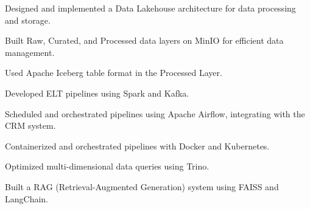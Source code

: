 \vspace{0.10 cm}
\begin{onecolentry}
    \begin{highlights}
        \item Designed and implemented a Data Lakehouse architecture for data processing and storage.
        \item Built Raw, Curated, and Processed data layers on MinIO for efficient data management.
        \item Used Apache Iceberg table format in the Processed Layer.
        \item Developed ELT pipelines using Spark and Kafka.
        \item Scheduled and orchestrated pipelines using Apache Airflow, integrating with the CRM system.
        \item Containerized and orchestrated pipelines with Docker and Kubernetes.
        \item Optimized multi-dimensional data queries using Trino.
        \item Built a RAG (Retrieval-Augmented Generation) system using FAISS and LangChain.
    \end{highlights}
\end{onecolentry}




    



        

            

                


